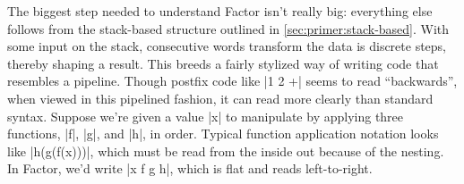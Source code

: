 The biggest step needed to understand Factor isn't really big: everything else
follows from the stack-based structure outlined in
\ref{sec:primer:stack-based}.  With some input on the stack, consecutive words
transform the data is discrete steps, thereby shaping a result.  This breeds a
fairly stylized way of writing code that resembles a pipeline.  Though postfix
code like \inlinecode|1 2 +| seems to read ``backwards'', when viewed in this
pipelined fashion, it can read more clearly than standard syntax.  Suppose
we're given a value \inlinecode|x| to manipulate by applying three functions,
\inlinecode|f|, \inlinecode|g|, and \inlinecode|h|, in order.  Typical function
application notation looks like \inlinecode|h(g(f(x)))|, which must be read
from the inside out because of the nesting.  In Factor, we'd write
\inlinecode|x f g h|, which is flat and reads left-to-right.

